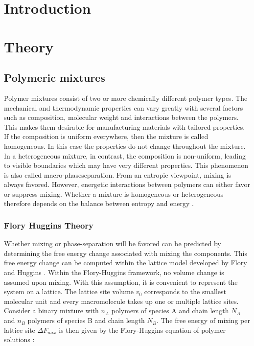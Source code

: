 \documentclass[bachelor,       %
               twoside,        %
               BCOR10mm,       %
                ngerman,english  %
               ]{GAUBM}
\begin{document}
\mainmatter   %

\chapter{Introduction}


\chapter{Theory}

\section{Polymeric mixtures}

Polymer mixtures consist of two or more chemically different polymer types. The mechanical and thermodynamic properties can vary greatly with several factors such as composition, molecular weight and interactions between the polymers. This makes them desirable for manufacturing materials with tailored properties.\\
If the composition is uniform everywhere, then the mixture is called homogeneous. In this case the properties do not change throughout the mixture. In a heterogeneous mixture, in contrast, the composition is non-uniform, leading to visible boundaries which may have very different properties. This phenomenon is also called macro-phaseseparation. From an entropic viewpoint, mixing is always favored. However, energetic interactions between polymers can either favor or suppress mixing. Whether a mixture is homogeneous or heterogeneous therefore depends on the balance between entropy and energy \cite[S. 137]{Rubin03}.           

\subsection{Flory Huggins Theory}

Whether mixing or phase-separation will be favored can be predicted by determining the free energy change associated with mixing the components. This free energy change can be computed within the lattice model developed by Flory and Huggins \cite{Flory42}. Within the Flory-Huggins framework, no volume change is assumed upon mixing. With this assumption, it is convenient to represent the system on a lattice. The lattice site volume $v_0$ corresponds to the smallest molecular unit and every macromolecule takes up one or multiple lattice sites. Consider a binary mixture with $n_A$ polymers of species A and chain length $N_A$ and $n_B$ polymers of species B and chain length $N_B$. The free energy of mixing per lattice site $\Delta F_{mix}$ is then given by the Flory-Huggins equation of polymer solutions \cite[S. 143]{Rubin03}:
\end{document}
